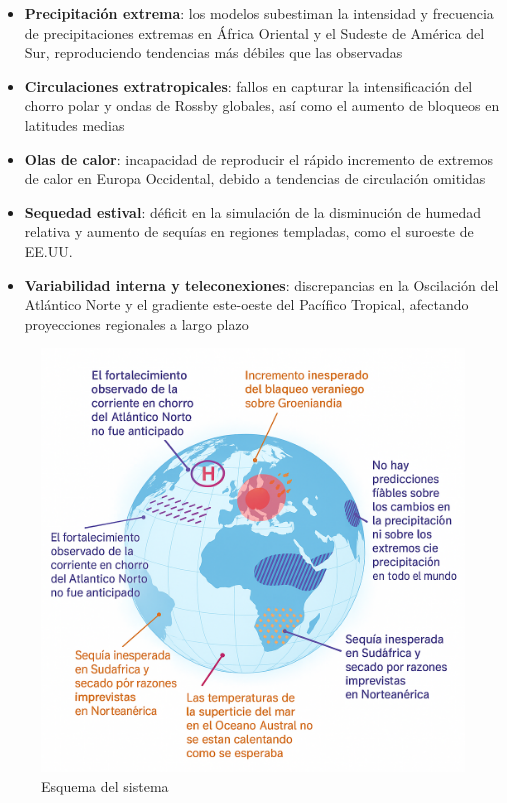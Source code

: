 \documentclass[
  11pt,
  a4paper,
  DIV=11,
  numbers=noendperiod]{scrreprt}
\providecommand{\tightlist}{%
  \setlength{\itemsep}{0pt}\setlength{\parskip}{0pt}}
\begin{document}
\begin{itemize}
\tightlist
\item
  \textbf{Precipitación extrema}: los modelos subestiman la intensidad y
  frecuencia de precipitaciones extremas en África Oriental y el Sudeste
  de América del Sur, reproduciendo tendencias más débiles que las
  observadas\\
\item
  \textbf{Circulaciones extratropicales}: fallos en capturar la
  intensificación del chorro polar y ondas de Rossby globales, así como
  el aumento de bloqueos en latitudes medias\\
\item
  \textbf{Olas de calor}: incapacidad de reproducir el rápido incremento
  de extremos de calor en Europa Occidental, debido a tendencias de
  circulación omitidas
\item
  \textbf{Sequedad estival}: déficit en la simulación de la disminución
  de humedad relativa y aumento de sequías en regiones templadas, como
  el suroeste de EE.UU.\\
\item
  \textbf{Variabilidad interna y teleconexiones}: discrepancias en la
  Oscilación del Atlántico Norte y el gradiente este-oeste del Pacífico
  Tropical, afectando proyecciones regionales a largo plazo
\end{itemize}

\begin{figure}

{\centering \includegraphics[width=0.6\linewidth,height=\textheight,keepaspectratio]{04-clima/fallos.png}

}

\caption{Esquema del sistema}

\end{figure}%
\end{document}
